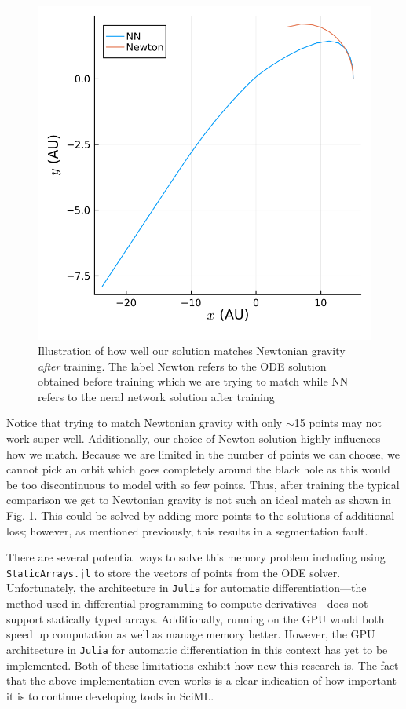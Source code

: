 \documentclass{CUP-JNL-DTM}%
\theoremstyle{definition}
\numberwithin{equation}{section}
\newcommand{\Julia}{\texttt{Julia} }
\begin{document}
\begin{figure}
    \centering
    \includegraphics[width=0.3\linewidth]{figures/compare_to_newton.png}
    \caption{Illustration of how well our solution matches Newtonian gravity \emph{after} training. The label Newton refers to the ODE solution obtained before training which we are trying to match while NN refers to the neral network solution after training}
    \label{fig:compare_newton}
\end{figure}

Notice that trying to match Newtonian gravity with only $\sim$15 points may not work super well. Additionally, our choice of Newton solution highly influences how we match. Because we are limited in the number of points we can choose, we cannot pick an orbit which goes completely around the black hole as this would be too discontinuous to model with so few points. Thus, after training the typical comparison we get to Newtonian gravity is not such an ideal match as shown in Fig. \ref{fig:compare_newton}. This could be solved by adding more points to the solutions of additional loss; however, as mentioned previously, this results in a segmentation fault. 

There are several potential ways to solve this memory problem including using \texttt{StaticArrays.jl} to store the vectors of points from the ODE solver. Unfortunately, the architecture in \Julia for automatic differentiation---the method used in differential programming to compute derivatives---does not support statically typed arrays. Additionally, running on the GPU would both speed up computation as well as manage memory better. However, the GPU architecture in \Julia for automatic differentiation in this context has yet to be implemented. Both of these limitations exhibit how new this research is. The fact that the above implementation even works is a clear indication of how important it is to continue developing tools in SciML. 

\end{document}
